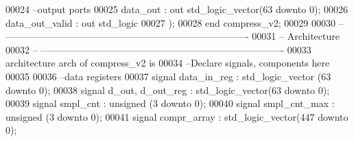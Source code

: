 \begin{DoxyCode}
00024 \textcolor{keyword}{        --output ports }
00025         \textcolor{vhdlchar}{data_out}        \textcolor{vhdlchar}{:} \textcolor{keywordflow}{out} \textcolor{comment}{std\_logic\_vector}\textcolor{vhdlchar}{(}\textcolor{vhdllogic}{}\textcolor{vhdllogic}{63} \textcolor{keywordflow}{downto} \textcolor{vhdllogic}{}\textcolor{vhdllogic}{0}\textcolor{vhdlchar}{)};
00026         \textcolor{vhdlchar}{data_out_valid}  \textcolor{vhdlchar}{:} \textcolor{keywordflow}{out} \textcolor{comment}{std\_logic}       
00027         \textcolor{vhdlchar}{)};
00028 \textcolor{keywordflow}{end} \textcolor{vhdlchar}{compress\_v2};
00029 
00030 \textcolor{keyword}{-- ----------------------------------------------------------------------------}
00031 \textcolor{keyword}{-- Architecture}
00032 \textcolor{keyword}{-- ----------------------------------------------------------------------------}
00033 \textcolor{keywordflow}{architecture} arch \textcolor{keywordflow}{of} compress_v2 is
00034 \textcolor{keyword}{--Declare signals,  components here}
00035 
00036 \textcolor{keyword}{--data registers}
00037 \textcolor{keywordflow}{signal} \textcolor{vhdlchar}{data_in_reg}              \textcolor{vhdlchar}{:} \textcolor{comment}{std\_logic\_vector} \textcolor{vhdlchar}{(}\textcolor{vhdllogic}{}\textcolor{vhdllogic}{63} \textcolor{keywordflow}{downto} \textcolor{vhdllogic}{}\textcolor{vhdllogic}{0}\textcolor{vhdlchar}{)};
00038 \textcolor{keywordflow}{signal} \textcolor{vhdlchar}{d_out}\textcolor{vhdlchar}{,} \textcolor{vhdlchar}{d_out_reg}     \textcolor{vhdlchar}{:} \textcolor{comment}{std\_logic\_vector}\textcolor{vhdlchar}{(}\textcolor{vhdllogic}{}\textcolor{vhdllogic}{63} \textcolor{keywordflow}{downto} \textcolor{vhdllogic}{}\textcolor{vhdllogic}{0}\textcolor{vhdlchar}{)};
00039 \textcolor{keywordflow}{signal} \textcolor{vhdlchar}{smpl_cnt}                 \textcolor{vhdlchar}{:} \textcolor{comment}{unsigned} \textcolor{vhdlchar}{(}\textcolor{vhdllogic}{}\textcolor{vhdllogic}{3} \textcolor{keywordflow}{downto} \textcolor{vhdllogic}{}\textcolor{vhdllogic}{0}\textcolor{vhdlchar}{)};
00040 \textcolor{keywordflow}{signal} \textcolor{vhdlchar}{smpl_cnt_max}             \textcolor{vhdlchar}{:} \textcolor{comment}{unsigned} \textcolor{vhdlchar}{(}\textcolor{vhdllogic}{}\textcolor{vhdllogic}{3} \textcolor{keywordflow}{downto} \textcolor{vhdllogic}{}\textcolor{vhdllogic}{0}\textcolor{vhdlchar}{)};
00041 \textcolor{keywordflow}{signal} \textcolor{vhdlchar}{compr_array}              \textcolor{vhdlchar}{:} \textcolor{comment}{std\_logic\_vector}\textcolor{vhdlchar}{(}\textcolor{vhdllogic}{}\textcolor{vhdllogic}{447} \textcolor{keywordflow}{downto} \textcolor{vhdllogic}{}\textcolor{vhdllogic}{0}\textcolor{vhdlchar}{)};

\end{DoxyCode}
